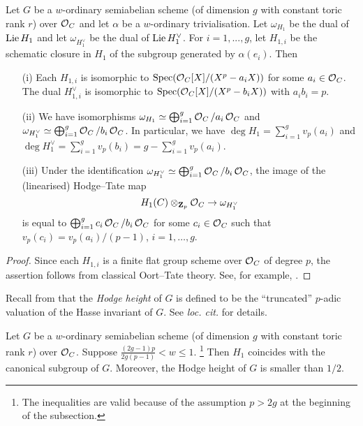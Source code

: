 \begin{Lemma}\label{Lemma: Oort--Tate theory}
Let $G$ be a $w$-ordinary semiabelian scheme (of dimension $g$ with constant toric rank $r$) over $\operatorname{\mathcal{O}}_C$ and let $\alpha$ be a $w$-ordinary trivialisation. Let ${\omega}_{H_1}$ be the dual of $\operatorname{Lie} H_1$ and let $\omega_{H_1^{\vee}}$ be the dual of $\operatorname{Lie} H_1^{\vee}$. For $i=1, ..., g$, let $H_{1, i}$ be the schematic closure in $H_1$ of the subgroup generated by $\alpha(e_i)$. Then \begin{enumerate}
    \item[(i)] Each $H_{1, i}$ is isomorphic to $\operatorname{Spec}(\operatorname{\mathcal{O}}_C[X]/(X^p - a_{i}X))$ for some $a_i\in \operatorname{\mathcal{O}}_C$. The dual $H_{1, i}^{\vee}$ is isomorphic to $\operatorname{Spec}(\operatorname{\mathcal{O}}_C[X]/(X^p-b_iX))$ with $a_ib_i = p$. 
    \item[(ii)] We have isomorphisms ${\omega}_{H_1} \simeq \bigoplus_{i=1}^g \operatorname{\mathcal{O}}_C/a_i\operatorname{\mathcal{O}}_C$ and 
${\omega}_{H_1^{\vee}} \simeq \bigoplus_{i=1}^g \operatorname{\mathcal{O}}_C/b_i\operatorname{\mathcal{O}}_C$. In particular, we have $\deg H_1 = \sum_{i=1}^{g}v_p(a_i)$ and $\deg H_1^{\vee}=\sum_{i=1}^{g}v_p(b_i)=g-\sum_{i=1}^{g}v_p(a_i)$.
    \item[(iii)] Under the identification ${\omega}_{H_1^{\vee}} \simeq \bigoplus_{i=1}^g \operatorname{\mathcal{O}}_C/b_i\operatorname{\mathcal{O}}_C$, the image of the (linearised) Hodge--Tate map \[
        H_1(C) \otimes_{\operatorname{\mathbf{Z}}_p} \operatorname{\mathcal{O}}_C \rightarrow {\omega}_{H_1^{\vee}}
    \] is equal to $\bigoplus_{i=1}^g c_i\operatorname{\mathcal{O}}_C/b_i\operatorname{\mathcal{O}}_C$ for some $c_i\in \operatorname{\mathcal{O}}_C$ such that $v_p(c_i) = v_p(a_i)/(p-1)$, $i=1, \ldots, g$.
\end{enumerate}
\end{Lemma}
\begin{proof}
Since each $H_{1, i}$ is a finite flat group scheme over $\operatorname{\mathcal{O}}_{C}$ of degree $p$, the assertion follows from classical Oort--Tate theory. See, for example, \cite[\S 6.5, Lemme 9]{Fargues-canonical}. 
\end{proof}

Recall from \cite[\S 3.1]{AIP-2015} that the \emph{Hodge height} of $G$ is defined to be the ``truncated'' $p$-adic valuation of the Hasse invariant of $G$. See \emph{loc. cit.} for details.

\begin{Lemma}\label{Lemma: pseudocanonical = canonical}
Let $G$ be a $w$-ordinary semiabelian scheme (of dimension $g$ with constant toric rank $r$) over $\operatorname{\mathcal{O}}_C$. Suppose $\frac{(2g-1)p}{2g(p-1)} < w \leq 1$. \footnote{The inequalities are valid because of the assumption $p>2g$ at the beginning of the subsection.} Then $H_1$ coincides with the canonical subgroup of $G$. Moreover, the Hodge height of $G$ is smaller than $1/2$. 
\end{Lemma}

